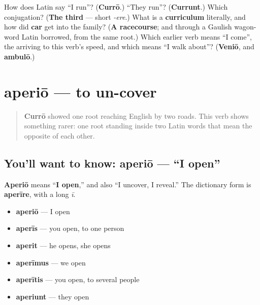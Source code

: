 \begin{tcolorbox}[breakable,colback=teal!4,colframe=teal!35!black,title={Before you move on}]
How does Latin say \textquotedblleft{}I run\textquotedblright{}? (\textbf{Currō}.) \textquotedblleft{}They run\textquotedblright{}? (\textbf{Currunt}.) Which conjugation? (\textbf{The third} — short \emph{-ere}.) What is a \textbf{curriculum} literally, and how did \textbf{car} get into the family? (\textbf{A racecourse}; and through a Gaulish wagon-word Latin borrowed, from the same root.) Which earlier verb means \textquotedblleft{}I come\textquotedblright{}, the arriving to this verb's speed, and which means \textquotedblleft{}I walk about\textquotedblright{}? (\textbf{Veniō}, and \textbf{ambulō}.)
\end{tcolorbox}
\section[aperiō, aperīre]{aperiō — to un-cover}

\label{lesson:LA-C41-aperio}



\begin{quote}
\textbf{Currō} showed one root reaching English by two roads. This verb shows something rarer: one root standing inside two Latin words that mean the opposite of each other.
\end{quote}

\subsection*{You'll want to know: aperiō — \textquotedblleft{}I open\textquotedblright{}}
\textbf{Aperiō} means \textquotedblleft{}\textbf{I open},\textquotedblright{} and also \textquotedblleft{}I uncover, I reveal.\textquotedblright{} The dictionary form is \textbf{aperīre}, with a long \emph{ī}.

\begin{itemize}
\raggedright
  \item \textbf{aperiō} — I open
  \item \textbf{aperīs} — you open, to one person
  \item \textbf{aperit} — he opens, she opens
  \item \textbf{aperīmus} — we open
  \item \textbf{aperītis} — you open, to several people
  \item \textbf{aperiunt} — they open
\end{itemize}

